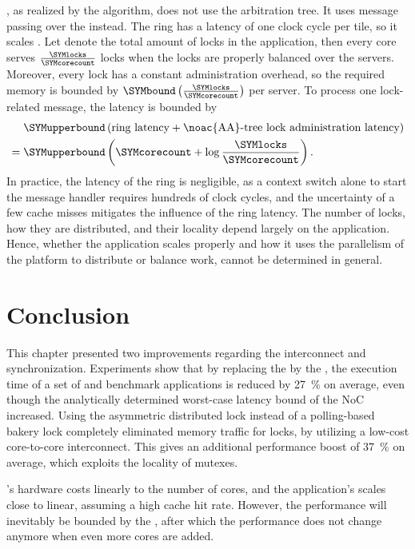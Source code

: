 , as realized by the  algorithm, does not use the arbitration tree.
It uses message passing over the  instead.
The ring has a latency of one clock cycle per tile, so it scales \SYMupperbound[\SYMcorecount].
Let \SYMlocks denote the total amount of locks in the application, then every core serves $\frac{\SYMlocks}{\SYMcorecount}$ locks when the locks are properly balanced over the servers.
Moreover, every lock has a constant administration overhead, so the required memory is bounded by $\SYMbound\left(\frac{\SYMlocks}{\SYMcorecount}\right)$ per server.
To process one lock-related message, the latency is bounded by
\begin{align}
		& \SYMupperbound\left(
			\text{ring latency} + \text{\noac{AA}-tree lock administration latency}
		\right) \notag\\
=\;		& \SYMupperbound\left(
			\SYMcorecount + \log\frac{\SYMlocks}{\SYMcorecount}
		\right).
\end{align}
In practice, the latency of the ring is negligible, as a context switch alone to start the message handler requires hundreds of clock cycles, and the uncertainty of a few cache misses mitigates the influence of the ring latency.
The number of locks, how they are distributed, and their locality depend largely on the application.
Hence, whether the application scales properly and how it uses the parallelism of the platform to distribute or balance work, cannot be determined in general.


\section{Conclusion}

This chapter presented two improvements regarding the interconnect and synchronization.
Experiments show that by replacing the  \aethereal* by the  \Warpfield* {}, the execution time of a set of \SPLASH* and \PARSEC* benchmark applications is reduced by \SI{27}{\percent} on average, even though the analytically determined worst-case latency bound of the \ac{NoC} increased.
Using the asymmetric distributed lock instead of a polling-based bakery lock completely eliminated memory traffic for locks, by utilizing a low-cost core-to-core interconnect.
This gives an additional performance boost of \SI{37}{\percent} on average, which exploits the locality of mutexes.

\Warpfield's hardware costs  linearly to the number of cores, and the application's  scales close to linear, assuming a high cache hit rate.
However, the performance will inevitably be bounded by the , after which the performance does not change anymore when even more cores are added.

